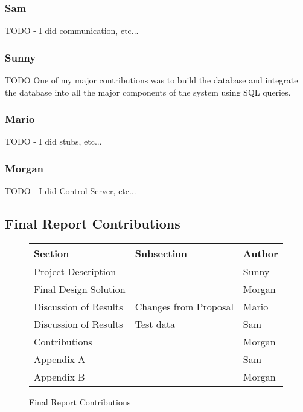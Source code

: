 \subsubsection{Sam}
TODO
- I did communication, etc...
\subsubsection{Sunny}
TODO
One of my major contributions was to build the 
database and integrate the database into all 
the major components of the system using SQL queries.
\subsubsection{Mario}
TODO
- I did stubs, etc...
\subsubsection{Morgan}
TODO
- I did Control Server, etc...

\subsection{Final Report Contributions}

\begin{figure}[!htb]
\centering
\begin{tabular}{lll}
Section               & Subsection            & Author\\
\hline
Project Description   &                       & Sunny\\
Final Design Solution &                       & Morgan\\
Discussion of Results & Changes from Proposal & Mario\\
Discussion of Results & Test data             & Sam\\
Contributions         &                       & Morgan\\
Appendix A            &                       & Sam\\
Appendix B            &                       & Morgan\\
\end{tabular}
\caption{Final Report Contributions}
\label{fig:final-report-contributions}
\end{figure}
